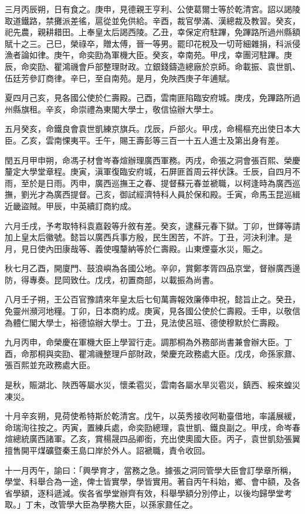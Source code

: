 \begin{pinyinscope}
三月丙辰朔，日有食之。庚申，見德親王亨利、公使葛爾士等於乾清宮。詔以謁陵取道鐵路，禁攤派差徭，扈從並免供給。辛酉，裁官學滿、漢總裁及教習。癸亥，祀先農，親耕耤田。上奉皇太后謁西陵。乙丑，幸保定府駐蹕，免蹕路所過州縣額賦十之三。己巳，榮祿卒，贈太傅，晉一等男。罷印花稅及一切苛細雜捐，科派侵漁者論如律。庚午，命奕劻為軍機大臣。癸亥，幸南苑。甲戌，幸團河駐蹕。庚辰，命奕劻、瞿鴻禨會戶部整理財政。立銀錢鑄造總廠於京師。命載振、袁世凱、伍廷芳參訂商律。辛巳，至自南苑。是月，免陜西庚子年逋賦。

夏四月己亥，見各國公使於仁壽殿。己酉，雲南匪陷臨安府城。庚戌，免蹕路所過州縣旗租。辛亥，命崇禮為東閣大學士，敬信協辦大學士。

五月癸亥，命鐵良會袁世凱練京旗兵。戊辰，戶部火。甲戌，命楊樞充出使日本大臣。乙亥，雲南惈夷平。壬午，賜王壽彭等三百一十五人進士及第出身有差。

閏五月甲申朔，命馮子材會岑春煊辦理廣西軍務。丙戌，命張之洞會張百熙、榮慶釐定大學堂章程。庚寅，滇軍復臨安府城，石屏匪首周云祥伏誅。壬辰，自四月不雨，至於是日雨。丙申，廣西巡撫王之春、提督蘇元春並褫職，以柯逢時為廣西巡撫，劉光才為廣西提督。己亥，御試經濟特科人員於保和殿。壬寅，命馬玉昆巡緝近畿盜賊。甲辰，中英續訂商約成。

六月壬戌，予考取特科袁嘉穀等升敘有差。癸亥，逮蘇元春下獄。丁卯，世鐸等請加上皇太后徽號。懿旨以廣西兵事方殷，民生困苦，不許。丁丑，河決利津。是月，見日使內田康哉等、義使嘎釐納等於仁壽殿。山東煙臺水災，賑之。

秋七月乙酉，開廈門、鼓浪嶼為各國公地。辛卯，賞鄭孝胥四品京堂，督辦廣西邊防，得專奏。昆岡致仕。戊戌，初置商部，以載振為尚書。

八月壬子朔，王公百官豫請來年皇太后七旬萬壽報效廉俸申祝，懿旨止之。癸丑，免靈州瀕河地糧。丁卯，日本商約成。庚寅，見各國公使於仁壽殿。壬申，以敬信為體仁閣大學士，裕德協辦大學士。丁丑，見法使呂班、德使穆默於仁壽殿。

九月丙申，命榮慶在軍機大臣上學習行走。調那桐為外務部尚書兼會辦大臣。丁酉，命那桐與奕劻、瞿鴻禨整理戶部財政，榮慶充政務處大臣。戊戌，命孫家鼐、張百熙並充政務處大臣。

是秋，賑湖北、陜西等屬水災，懷柔雹災，雲南各屬水旱災雹災，鎮西、綏來蝗災凍災。

十月辛亥朔，見荷使希特斯於乾清宮。戊午，以英秀接收阿勒臺借地，率議展緩，命瑞洵往按之。丙寅，置練兵處，命奕劻總理，袁世凱、鐵良副之。甲戌，命岑春煊總統廣西諸軍。乙亥，賞楊晟四品卿銜，充出使奧國大臣。丙子，袁世凱劾張翼擅售開平煤礦暨秦王島口岸於外人。詔褫職，責令收回。

十一月丙午，諭曰：「興學育才，當務之急。據張之洞同管學大臣會訂學章所稱，學堂、科舉合為一途，俾士皆實學，學皆實用。著自丙午科始，鄉、會中額，及各省學額，逐科遞減。俟各省學堂辦齊有效，科舉學額分別停止，以後均歸學堂考取。」丁未，改管學大臣為學務大臣，以孫家鼐任之。


\end{pinyinscope}
